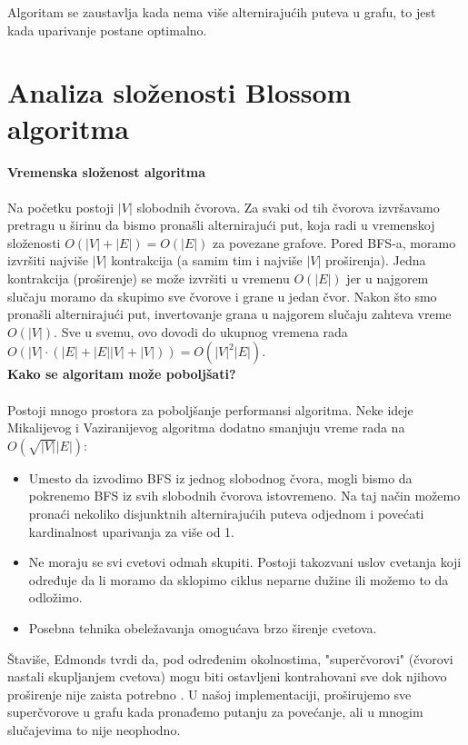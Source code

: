 \documentclass[11pt,a4paper]{article}
\theoremstyle{definition}
\begin{document}
Algoritam se zaustavlja kada nema više alternirajućih puteva u grafu, to jest kada uparivanje postane optimalno.

\newpage
\section{Analiza složenosti Blossom algoritma}
\vspace{0.5cm}
\noindent\textbf{Vremenska složenost algoritma}\\ \\
Na početku postoji $|V|$ slobodnih čvorova. Za svaki od tih čvorova izvršavamo pretragu u širinu da bismo pronašli alternirajući put, koja radi u vremenskoj složenosti $O(|V|+|E|) = O(|E|)$ za povezane grafove. Pored BFS-a, moramo izvršiti najviše $|V|$ kontrakcija (a samim tim i najviše $|V|$ proširenja). Jedna kontrakcija (proširenje) se može izvršiti u vremenu $O(|E|)$ jer u najgorem slučaju moramo da skupimo sve čvorove i grane u jedan čvor. Nakon što smo pronašli alternirajući put, invertovanje grana u najgorem slučaju zahteva vreme $O(|V|)$. Sve u svemu, ovo dovodi do ukupnog vremena rada $O(|V| \cdot (|E|+|E||V|+|V|))=O(|V|^2|E|)$.
\vspace{0.5cm}\\
\textbf{Kako se algoritam može poboljšati?} \\ \\
Postoji mnogo prostora za poboljšanje performansi algoritma. Neke ideje Mikalijevog i Vaziranijevog algoritma dodatno smanjuju vreme rada na $O(\sqrt{|V|}|E|)$:
\begin{itemize}
\item Umesto da izvodimo BFS iz jednog slobodnog čvora, mogli bismo da pokrenemo BFS iz svih slobodnih čvorova istovremeno. Na taj način možemo pronaći nekoliko disjunktnih alternirajućih puteva odjednom i povećati kardinalnost uparivanja za više od 1.
\item Ne moraju se svi cvetovi odmah skupiti. Postoji takozvani uslov cvetanja koji određuje da li moramo da sklopimo ciklus neparne dužine ili možemo to da odložimo.
\item Posebna tehnika obeležavanja omogućava brzo širenje cvetova.
\end{itemize}
Štaviše, Edmonds tvrdi da, pod određenim okolnostima, "superčvorovi" (čvorovi nastali skupljanjem cvetova) mogu biti ostavljeni kontrahovani sve dok njihovo proširenje nije zaista potrebno \cite{knjiga2}. U našoj implementaciji, proširujemo sve superčvorove u grafu kada pronađemo putanju za povećanje, ali u mnogim slučajevima to nije neophodno.
\end{document}
